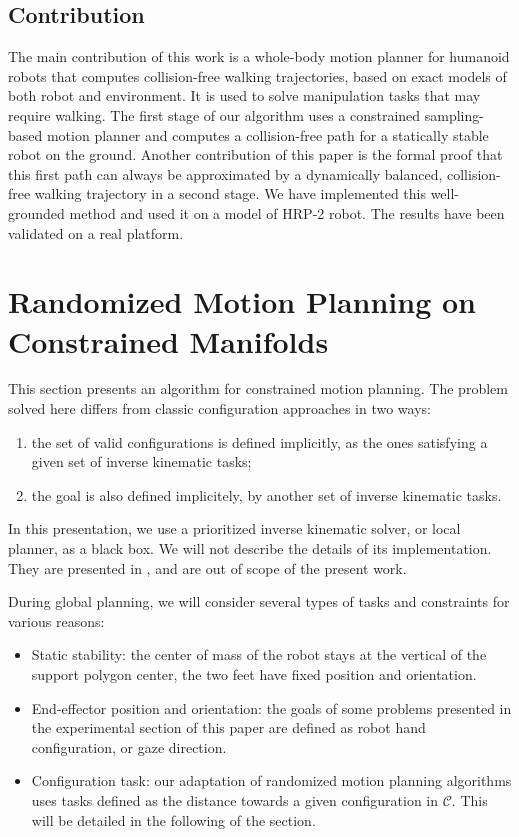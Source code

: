 \documentclass{article}
\begin{document}
\subsection{Contribution}

The main contribution of this work is a  whole-body motion planner for humanoid robots
that computes collision-free walking trajectories, based on
exact models of both robot and environment. It is used to solve manipulation tasks
that may require walking. The first stage of our algorithm uses a
constrained sampling-based motion 
planner and  computes a collision-free path  for a statically stable robot on the
ground. Another  contribution of this  paper is the formal  proof that
this first path can always be  approximated by a dynamically balanced, collision-free
walking  trajectory in a second stage. We have implemented this well-grounded 
method and  used it on a model of  HRP-2 robot.  The results have been  
validated on a real platform.

\section{Randomized Motion Planning on Constrained Manifolds}
\label{sec:wb}

This section presents an algorithm for constrained motion planning. 
The problem solved here
differs from classic configuration approaches in two ways:
\begin{enumerate}
\item the set of valid configurations is defined implicitly, as the ones satisfying a given 
  set of inverse kinematic tasks;
\item the goal is also defined implicitely, by another set of inverse kinematic tasks.
\end{enumerate}
In this presentation, we use a prioritized inverse kinematic solver, or local planner,
 as a black box. We will not describe the details of its implementation. They are presented in 
\cite{yoshida2006tds}, and are out of scope of the present work.


During global planning, we will consider several types of
tasks and constraints for various reasons:
\begin{itemize}
\item  Static stability: the center of mass of the robot stays at
  the vertical of the support polygon center, the two feet have fixed position and
  orientation.
\item End-effector position and orientation: the goals of some problems presented
  in the experimental section of this paper are defined as robot hand configuration,
  or gaze direction.
\item Configuration task: our adaptation of randomized motion planning algorithms 
  uses tasks defined as the distance towards a given configuration in $\mathcal{C}$. 
  This will be detailed in the following of the section.
\end{itemize}
\end{document}
